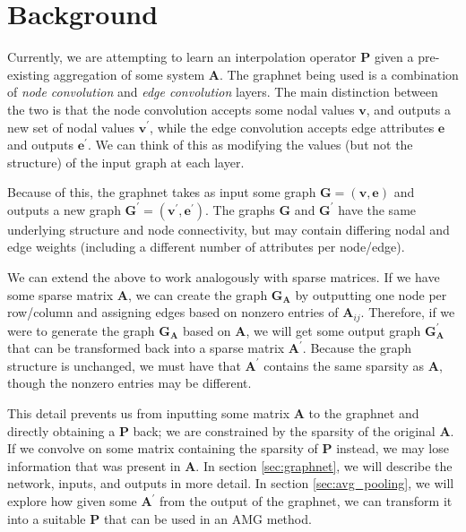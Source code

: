 \documentclass{article}
\newcommand{\mat}[1]{\bm{{#1}}}
\renewcommand{\vec}[1]{\bm{{#1}}}
\begin{document}
\section{Background}\label{sec:background}
Currently, we are attempting to learn an interpolation operator $\mat{P}$ given a pre-existing aggregation of some system $\mat{A}$.  The graphnet being used is a combination of \textit{node convolution} and \textit{edge convolution} layers.  The main distinction between the two is that the node convolution accepts some nodal values $\vec{v}$, and outputs a new set of nodal values $\vec{v}^\prime$, while the edge convolution accepts edge attributes $\vec{e}$ and outputs $\vec{e}^\prime$.  We can think of this as modifying the values (but not the structure) of the input graph at each layer.

Because of this, the graphnet takes as input some graph $\mat{G} = \left(\vec{v}, \vec{e}\right)$ and outputs a new graph $\mat{G}^\prime = \left(\vec{v}^\prime, \vec{e}^\prime\right)$.  The graphs $\mat{G}$ and $\mat{G}^\prime$ have the same underlying structure and node connectivity, but may contain differing nodal and edge weights (including a different number of attributes per node/edge).

We can extend the above to work analogously with sparse matrices.  If we have some sparse matrix $\mat{A}$, we can create the graph $\mat{G}_{\mat{A}}$ by outputting one node per row/column and assigning edges based on nonzero entries of $\mat{A}_{ij}$.  Therefore, if we were to generate the graph $\mat{G}_{\mat{A}}$ based on $\mat{A}$, we will get some output graph $\mat{G}_{\mat{A}}^\prime$ that can be transformed back into a sparse matrix $\mat{A}^\prime$.  Because the graph structure is unchanged, we must have that $\mat{A}^\prime$ contains the same sparsity as $\mat{A}$, though the nonzero entries may be different.

This detail prevents us from inputting some matrix $\mat{A}$ to the graphnet and directly obtaining a $\mat{P}$ back; we are constrained by the sparsity of the original $\mat{A}$.  If we convolve on some matrix containing the sparsity of $\mat{P}$ instead, we may lose information that was present in $\mat{A}$.  In section \ref{sec:graphnet}, we will describe the network, inputs, and outputs in more detail.  In section \ref{sec:avg_pooling}, we will explore how given some $\mat{A}^\prime$ from the output of the graphnet, we can transform it into a suitable $\mat{P}$ that can be used in an AMG method.
\end{document}
